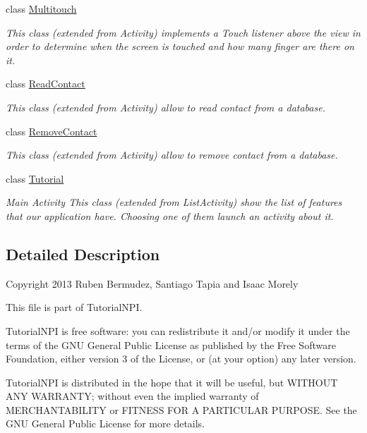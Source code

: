 \begin{DoxyCompactItemize}
class \hyperlink{classnpi_1_1practicaandroid_1_1tutorialnpi_1_1_multitouch}{Multitouch}
\begin{DoxyCompactList}\small\item\em This class (extended from Activity) implements a Touch listener above the view in order to determine when the screen is touched and how many finger are there on it. \end{DoxyCompactList}\item 
class \hyperlink{classnpi_1_1practicaandroid_1_1tutorialnpi_1_1_read_contact}{Read\-Contact}
\begin{DoxyCompactList}\small\item\em This class (extended from Activity) allow to read contact from a database. \end{DoxyCompactList}\item 
class \hyperlink{classnpi_1_1practicaandroid_1_1tutorialnpi_1_1_remove_contact}{Remove\-Contact}
\begin{DoxyCompactList}\small\item\em This class (extended from Activity) allow to remove contact from a database. \end{DoxyCompactList}\item 
class \hyperlink{classnpi_1_1practicaandroid_1_1tutorialnpi_1_1_tutorial}{Tutorial}
\begin{DoxyCompactList}\small\item\em Main Activity This class (extended from List\-Activity) show the list of features that our application have. Choosing one of them launch an activity about it. \end{DoxyCompactList}\end{DoxyCompactItemize}


\subsection{Detailed Description}
Copyright 2013 Ruben Bermudez, Santiago Tapia and Isaac Morely

This file is part of Tutorial\-N\-P\-I.

Tutorial\-N\-P\-I is free software\-: you can redistribute it and/or modify it under the terms of the G\-N\-U General Public License as published by the Free Software Foundation, either version 3 of the License, or (at your option) any later version.

Tutorial\-N\-P\-I is distributed in the hope that it will be useful, but W\-I\-T\-H\-O\-U\-T A\-N\-Y W\-A\-R\-R\-A\-N\-T\-Y; without even the implied warranty of M\-E\-R\-C\-H\-A\-N\-T\-A\-B\-I\-L\-I\-T\-Y or F\-I\-T\-N\-E\-S\-S F\-O\-R A P\-A\-R\-T\-I\-C\-U\-L\-A\-R P\-U\-R\-P\-O\-S\-E. See the G\-N\-U General Public License for more details.

